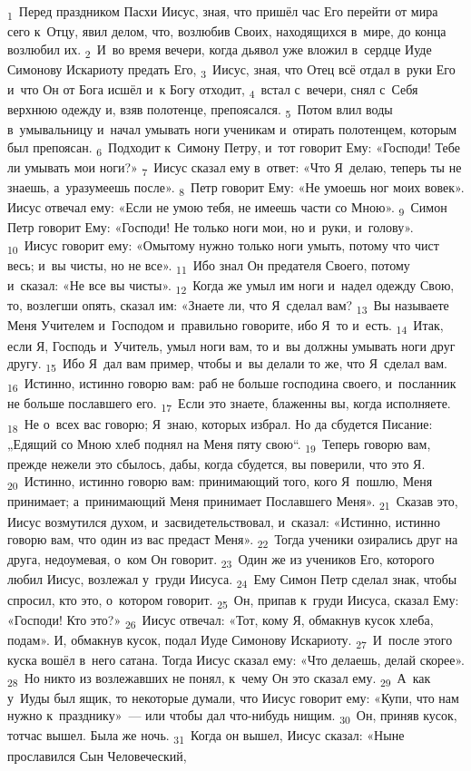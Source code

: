 \documentclass[a4paper,12pt]{article}
\begin{document}
\textsubscript{1}~Перед праздником Пасхи Иисус, зная, что пришёл час Его перейти от мира сего к~Отцу, явил делом, что, возлюбив Своих, находящихся в~мире, до конца возлюбил их. \textsubscript{2}~И~во время вечери, когда дьявол уже вложил в~сердце Иуде Симонову Искариоту предать Его, \textsubscript{3}~Иисус, зная, что Отец всё отдал в~руки Его и~что Он от Бога исшёл и~к Богу отходит, \textsubscript{4}~встал с~вечери, снял с~Себя верхнюю одежду и, взяв полотенце, препоясался. \textsubscript{5}~Потом влил воды в~умывальницу и~начал умывать ноги ученикам и~отирать полотенцем, которым был препоясан. \textsubscript{6}~Подходит к~Симону Петру, и~тот говорит Ему: «Господи! Тебе ли умывать мои ноги?» \textsubscript{7}~Иисус сказал ему в~ответ: «Что Я~делаю, теперь ты не знаешь, а~уразумеешь после». \textsubscript{8}~Петр говорит Ему: «Не умоешь ног моих вовек». Иисус отвечал ему: «Если не умою тебя, не имеешь части со Мною». \textsubscript{9}~Симон Петр говорит Ему: «Господи! Не только ноги мои, но и~руки, и~голову». \textsubscript{10}~Иисус говорит ему: «Омытому нужно только ноги умыть, потому что чист весь; и~вы чисты, но не все». \textsubscript{11}~Ибо знал Он предателя Своего, потому и~сказал: «Не все вы чисты». \textsubscript{12}~Когда же умыл им ноги и~надел одежду Свою, то, возлегши опять, сказал им: «Знаете ли, что Я~сделал вам? \textsubscript{13}~Вы называете Меня Учителем и~Господом и~правильно говорите, ибо Я~то и~есть. \textsubscript{14}~Итак, если Я, Господь и~Учитель, умыл ноги вам, то и~вы должны умывать ноги друг другу. \textsubscript{15}~Ибо Я~дал вам пример, чтобы и~вы делали то же, что Я~сделал вам. \textsubscript{16}~Истинно, истинно говорю вам: раб не больше господина своего, и~посланник не больше пославшего его. \textsubscript{17}~Если это знаете, блаженны вы, когда исполняете. \textsubscript{18}~Не о~всех вас говорю; Я~знаю, которых избрал. Но да сбудется Писание: „Едящий со Мною хлеб поднял на Меня пяту свою“. \textsubscript{19}~Теперь говорю вам, прежде нежели это сбылось, дабы, когда сбудется, вы поверили, что это Я. \textsubscript{20}~Истинно, истинно говорю вам: принимающий того, кого Я~пошлю, Меня принимает; а~принимающий Меня принимает Пославшего Меня». \textsubscript{21}~Сказав это, Иисус возмутился духом, и~засвидетельствовал, и~сказал: «Истинно, истинно говорю вам, что один из вас предаст Меня». \textsubscript{22}~Тогда ученики озирались друг на друга, недоумевая, о~ком Он говорит. \textsubscript{23}~Один же из учеников Его, которого любил Иисус, возлежал у~груди Иисуса. \textsubscript{24}~Ему Симон Петр сделал знак, чтобы спросил, кто это, о~котором говорит. \textsubscript{25}~Он, припав к~груди Иисуса, сказал Ему: «Господи! Кто это?» \textsubscript{26}~Иисус отвечал: «Тот, кому Я, обмакнув кусок хлеба, подам». И, обмакнув кусок, подал Иуде Симонову Искариоту. \textsubscript{27}~И~после этого куска вошёл в~него сатана. Тогда Иисус сказал ему: «Что делаешь, делай скорее». \textsubscript{28}~Но никто из возлежавших не понял, к~чему Он это сказал ему. \textsubscript{29}~А~как у~Иуды был ящик, то некоторые думали, что Иисус говорит ему: «Купи, что нам нужно к~празднику»~--- или чтобы дал что-нибудь нищим. \textsubscript{30}~Он, приняв кусок, тотчас вышел. Была же ночь. \textsubscript{31}~Когда он вышел, Иисус сказал: «Ныне прославился Сын Человеческий, 
\end{document}
